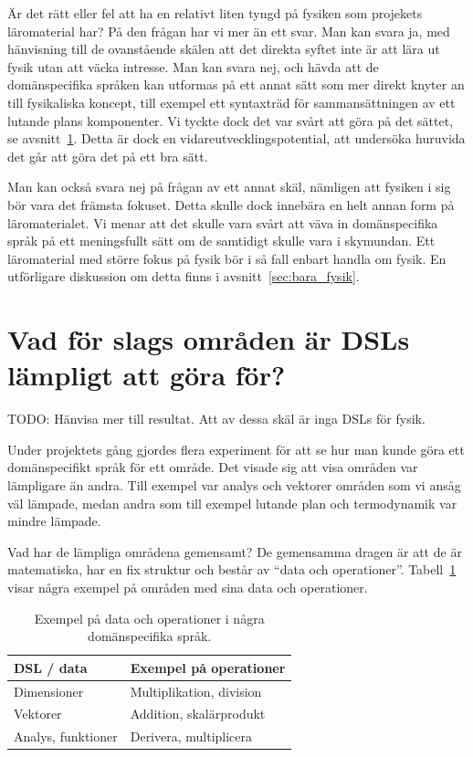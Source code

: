 \begin{binge}
Är det rätt eller fel att ha en relativt liten tyngd på fysiken som projekets läromaterial har? På den frågan har vi mer än ett svar. Man kan svara ja, med hänvisning till de ovanstående skälen att det direkta syftet inte är att lära ut fysik utan att väcka intresse. Man kan svara nej, och hävda att de domänspecifika språken kan utformas på ett annat sätt som mer direkt knyter an till fysikaliska koncept, till exempel ett syntaxträd för sammansättningen av ett lutande plans komponenter. Vi tyckte dock det var svårt att göra på det sättet, se avsnitt~\ref{sec:lampligt}. Detta är dock en vidareutvecklingspotential, att undersöka huruvida det går att göra det på ett bra sätt.

Man kan också svara nej på frågan av ett annat skäl, nämligen att fysiken i sig bör vara det främsta fokuset. Detta skulle dock innebära en helt annan form på läromaterialet. Vi menar att det skulle vara svårt att väva in domänspecifika språk på ett meningsfullt sätt om de samtidigt skulle vara i skymundan. Ett läromaterial med större fokus på fysik bör i så fall enbart handla om fysik. En utförligare diskussion om detta finns i avsnitt~\ref{sec:bara_fysik}.

\section{Vad för slags områden är DSLs lämpligt att göra för?}
\label{sec:lampligt}

TODO: Hänvisa mer till resultat. Att av dessa skäl är inga DSLs för fysik.

Under projektets gång gjordes flera experiment för att se hur man kunde göra ett domänspecifikt språk för ett område. Det visade sig att visa områden var lämpligare än andra. Till exempel var analys och vektorer områden som vi ansåg väl lämpade, medan andra som till exempel lutande plan och termodynamik var mindre lämpade.

Vad har de lämpliga områdena gemensamt? De gemensamma dragen är att de är
matematiska, har en fix struktur och består av ``data och operationer''.
Tabell~\ref{tab:data_och_ops} visar några exempel på områden med sina data och
operationer.

\begin{table}[tph]
\centering
\caption{Exempel på data och operationer i några domänspecifika språk.}
\label{tab:data_och_ops}
\begin{tabular}{@{}l|l@{}}
\toprule
DSL / data & Exempel på operationer \\ \midrule
Dimensioner & Multiplikation, division \\
Vektorer & Addition, skalärprodukt \\
Analys, funktioner & Derivera, multiplicera \\ \bottomrule
\end{tabular}
\end{table}


\end{binge}
